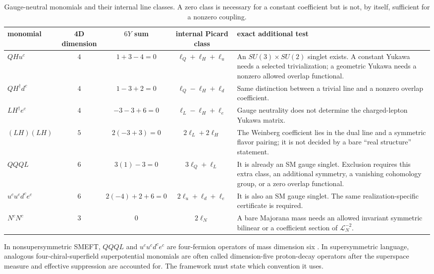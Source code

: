 \documentclass[11pt]{article}
\newcommand{\Line}{\mathcal{L}}
\begin{document}
\begin{table}[p]
\centering
\small
\caption{Gauge-neutral monomials and their internal line classes. A zero
class is necessary for a constant coefficient but is not, by itself,
sufficient for a nonzero coupling.}
\label{tab:operators}
\begin{tabularx}{\textwidth}{@{}lcccY@{}}
\toprule
monomial & 4D dimension & \(6Y\) sum & internal Picard class
& exact additional test \\
\midrule
\(QHu^c\) &
\(4\) &
\(1+3-4=0\) &
\(\ell_Q+\ell_H+\ell_u\) &
An \(SU(3)\times SU(2)\) singlet exists. A constant Yukawa needs a selected
trivialization; a geometric Yukawa needs a nonzero allowed overlap
functional.\\
\addlinespace
\(QH^\dagger d^c\) &
\(4\) &
\(1-3+2=0\) &
\(\ell_Q-\ell_H+\ell_d\) &
Same distinction between a trivial line and a nonzero overlap coefficient.\\
\addlinespace
\(LH^\dagger e^c\) &
\(4\) &
\(-3-3+6=0\) &
\(\ell_L-\ell_H+\ell_e\) &
Gauge neutrality does not determine the charged-lepton Yukawa matrix.\\
\addlinespace
\((LH)(LH)\) &
\(5\) &
\(2(-3+3)=0\) &
\(2\ell_L+2\ell_H\) &
The Weinberg coefficient lies in the dual line and a symmetric flavor
pairing; it is not decided by a bare ``real structure'' statement.\\
\addlinespace
\(QQQL\) &
\(6\) &
\(3(1)-3=0\) &
\(3\ell_Q+\ell_L\) &
It is already an SM gauge singlet. Exclusion requires this extra class,
an additional symmetry, a vanishing cohomology group, or a zero overlap
functional.\\
\addlinespace
\(u^cu^cd^ce^c\) &
\(6\) &
\(2(-4)+2+6=0\) &
\(2\ell_u+\ell_d+\ell_e\) &
It is also an SM gauge singlet. The same realization-specific certificate
is required.\\
\addlinespace
\(N^cN^c\) &
\(3\) &
\(0\) &
\(2\ell_N\) &
A bare Majorana mass needs an allowed invariant symmetric bilinear or a
coefficient section of \(\Line_N^{-2}\).\\
\bottomrule
\end{tabularx}
\end{table}

In nonsupersymmetric SMEFT, \(QQQL\) and \(u^cu^cd^ce^c\) are four-fermion
operators of mass dimension six \cite{Grzadkowski2010}. In supersymmetric
language, analogous four-chiral-superfield superpotential monomials are
often called dimension-five proton-decay operators after the superspace
measure and effective suppression are accounted for. The framework must
state which convention it uses.
\end{document}
